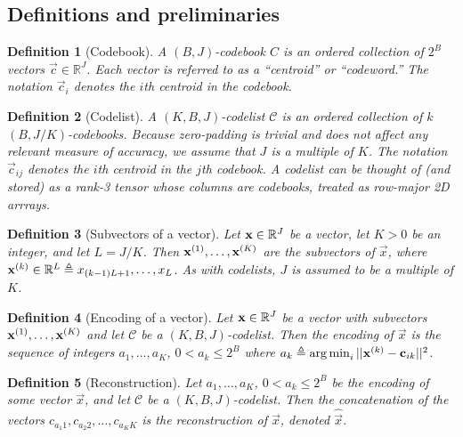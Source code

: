 \documentclass[]{article}
\newtheorem{definition}{Definition}[section]
\begin{document}
\subsection{Definitions and preliminaries}

\begin{definition}[Codebook]
A $(B, J)$-\textit{codebook} $C$ is an ordered collection of $2^B$ vectors $\vec{c} \in \mathbb{R}^J$. Each vector is referred to as a ``centroid'' or ``codeword.'' The notation $\vec{c}_i$ denotes the $i$th centroid in the codebook.
\end{definition}

\begin{definition}[Codelist]
A $(K, B, J)$-codelist $\mathcal{C}$ is an ordered collection of $k$ $(B, J / K)$-codebooks. Because zero-padding is trivial and does not affect any relevant measure of accuracy, we assume that $J$ is a multiple of $K$. The notation $\vec{c}_{ij}$ denotes the $i$th centroid in the $j$th codebook. A codelist can be thought of (and stored) as a rank-3 tensor whose columns are codebooks, treated as row-major 2D arrrays.
\end{definition}

\begin{definition}[Subvectors of a vector]
Let $\mathbf{x} \in \mathbb{R}^J$ be a vector, let $K > 0$ be an integer, and let $L = J / K$. Then $\mathbf{x}^{(1)},\ldots,\mathbf{x}^{(K)}$ are the subvectors of $\vec{x}$, where $\mathbf{x}^{(k)} \in \mathbb{R}^L \triangleq x_{(k-1)L + 1},\ldots,x_{L}$. As with codelists, $J$ is assumed to be a multiple of $K$.
\end{definition}

\begin{definition}[Encoding of a vector]
Let $\mathbf{x} \in \mathbb{R}^J$ be a vector with subvectors $\mathbf{x}^{(1)},\ldots,\mathbf{x}^{(K)}$ and let $\mathcal{C}$ be a $(K, B, J)$-codelist. Then the encoding of $\vec{x}$ is the sequence of integers $a_1,\ldots,a_K$, $0 < a_k \le 2^B$ where $a_k \triangleq \operatorname*{arg\,min}_i ||\mathbf{x}^{(k)} - \mathbf{c}_{ik}||^2$.
\end{definition}

\begin{definition}[Reconstruction]
Let $a_1,\ldots,a_K$, $0 < a_k \le 2^B$ be the encoding of some vector $\vec{x}$, and let $\mathcal{C}$ be a $(K, B, J)$-codelist. Then the concatenation of the vectors $c_{a_{1}1},c_{a_{2}2},\ldots,c_{a_{K}K}$ is the reconstruction of $\vec{x}$, denoted $\hat{\vec{x}}$.
\end{definition}
\end{document}
